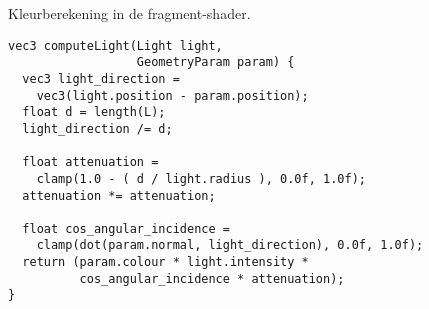 \begin{listing}[b]
  \centering %
%
  \caption{Kleurberekening in de fragment-shader.}
  \begin{verbatim}
vec3 computeLight(Light light,
                  GeometryParam param) {
  vec3 light_direction = 
    vec3(light.position - param.position);
  float d = length(L);
  light_direction /= d;

  float attenuation = 
    clamp(1.0 - ( d / light.radius ), 0.0f, 1.0f);
  attenuation *= attenuation;

  float cos_angular_incidence = 
    clamp(dot(param.normal, light_direction), 0.0f, 1.0f);
  return (param.colour * light.intensity * 
          cos_angular_incidence * attenuation);
}
  \end{verbatim}
  \label{lst:io-computeLight}
\end{listing}

